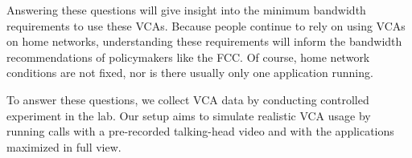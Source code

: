 Answering these questions will give insight into the minimum bandwidth requirements to use these VCAs. Because people continue to rely on using VCAs on home networks, understanding these requirements will inform the bandwidth recommendations of policymakers like the FCC. Of course, home network conditions are not fixed, nor is there usually only one application running. 

To answer these questions, we collect VCA data by conducting controlled experiment in the lab. Our setup aims to simulate realistic VCA usage by running calls with a pre-recorded talking-head video and with the applications maximized in full view. 








